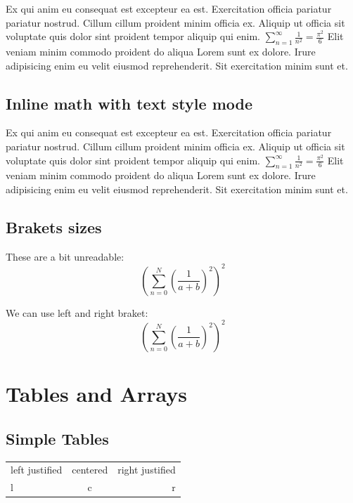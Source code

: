\documentclass[12pt]{article}
\begin{document}
Ex qui anim eu consequat est excepteur ea est. Exercitation officia pariatur pariatur nostrud. Cillum cillum proident minim officia ex. Aliquip ut officia sit voluptate quis dolor sint proident tempor aliquip qui enim. $ \displaystyle \sum_{n=1}^\infty \frac{1}{n^2} = \frac{\pi^2}{6} $ Elit veniam minim commodo proident do aliqua Lorem sunt ex dolore. Irure adipisicing enim eu velit eiusmod reprehenderit. Sit exercitation minim sunt et.

\subsection{Inline math with text style mode}

Ex qui anim eu consequat est excepteur ea est. Exercitation officia pariatur pariatur nostrud. Cillum cillum proident minim officia ex. Aliquip ut officia sit voluptate quis dolor sint proident tempor aliquip qui enim. $ \textstyle \sum_{n=1}^\infty \frac{1}{n^2} = \frac{\pi^2}{6} $ Elit veniam minim commodo proident do aliqua Lorem sunt ex dolore. Irure adipisicing enim eu velit eiusmod reprehenderit. Sit exercitation minim sunt et.

\subsection{Brakets sizes}

These are a bit unreadable:
\begin{equation*}
    ( \sum_{n=0}^N ( \frac{1}{a + b} )^2 )^2
\end{equation*}

\noindent We can use left and right braket:
\begin{equation*}
    \left( \sum_{n=0}^N \left( \frac{1}{a + b} \right)^2 \right)^2
\end{equation*}

\section{Tables and Arrays}

\subsection{Simple Tables}

\begin{tabular}{lcr}
    left justified & centered & right justified \\
    l & c & r
\end{tabular}
\end{document}
